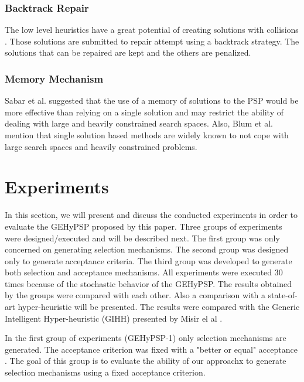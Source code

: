 \documentclass[conference]{IEEEtran}
\begin{document}
 \subsubsection{Backtrack Repair}

The low level heuristics have a great potential of creating solutions with collisions \cite{benitez2015algoritmo}. Those solutions are submitted to repair attempt using a backtrack strategy. The solutions that can be repaired are kept and the others are penalized. 
 


\subsubsection{Memory Mechanism}
Sabar et al. \cite{sabar2015automatic} suggested that the use of a memory of solutions to the PSP would be more effective than relying on a single solution and may restrict the ability of dealing with large and heavily constrained search spaces. Also, Blum et al. \cite{blum2011hybrid} mention that single solution based methods are widely known to not cope with large search spaces and heavily constrained problems.



\section{Experiments}
\label{sec:experiments}


In this section, we will present and discuss the conducted experiments in order to evaluate the GEHyPSP proposed by this paper. Three groups of experiments were designed/executed and will be described next. The first group was only concerned on generating selection mechanisms. The second group was designed only to generate acceptance criteria. The third group was developed to generate both selection and acceptance mechanisms. All experiments were executed 30 times because of the stochastic behavior of the GEHyPSP. The results obtained by the groups were compared with each other. Also a comparison with a state-of-art hyper-heuristic will be presented. The results were compared with the Generic Intelligent Hyper-heuristic (GIHH) presented by Misir el al \cite{misir2012intelligent}.

In the first group of  experiments (GEHyPSP-1) only selection mechanisms are generated. The acceptance criterion was fixed with a "better or equal" acceptance \cite{burke2009exploring}. The goal of this group is to evaluate the ability of our approachx to generate selection mechanisms using a fixed acceptance criterion.   
\end{document}
